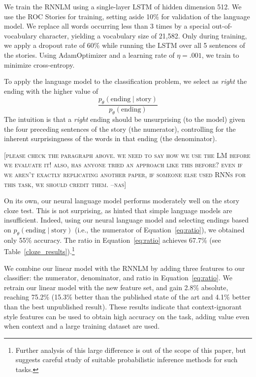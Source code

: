 \documentclass[11pt,a4paper]{article}
\newcommand{\tabref}[1]{Table~\ref{#1}}
\newcommand{\resolved}[1]{}
\newcommand{\nascomment}[1]{{\color{blue}\textsc{[#1 --nas]}}}
\begin{document}
We train the RNNLM using a single-layer LSTM \cite{hochreiter1997long} of hidden dimension 512.
We use the ROC Stories for training, setting aside 10\% for validation of the language model. 
We replace all words occurring less than 3 times by a special
out-of-vocabulary character, yielding a vocabulary size of  21,582.
Only during training, we apply a dropout rate of 60\% while running the LSTM over all 5 sentences of the stories. 
Using AdamOptimizer \cite{kingma2014adam} and a learning rate of
$\eta=.001$, we train to minimize cross-entropy. %

To apply the language model to the classification problem, we select
as \emph{right} the ending with the higher value of
\begin{equation}
\frac{p_\theta(\textrm{ending} \mid
  \textrm{story})}{p_\theta(\textrm{ending})} \label{eq:ratio}
\end{equation}
The intuition is that a \emph{right} ending should be unsurprising (to
the model)
given the four preceding sentences of the story (the numerator), controlling for the
inherent surprisingness of the words in that ending (the denominator).

\nascomment{please check the paragraph above.  we need to say how we
  use the LM before we evaluate it!  also, has anyone tried an approach like this
  before?  even if we aren't exactly replicating another paper, if
  someone else used RNNs for this task, we should credit them.}

On its own, our neural language model performs moderately well on the story cloze test. 
This is not surprising, as \citet{Mostafazadeh:2016} hinted  that
simple language models are insufficient.
Indeed, using our neural language model and selecting endings based on
$p_\theta(\textrm{ending} \mid \textrm{story})$ (i.e., the numerator of
Equation~\ref{eq:ratio}), we obtained only 55\% accuracy.   The ratio
in Equation~\ref{eq:ratio} achieves 67.7\%  (see
\tabref{cloze_results}).\footnote{Further analysis of this large
  difference is out of the scope of this paper, but suggests careful
  study of suitable probabilistic inference methods for such tasks.}

We combine our linear model with the RNNLM by adding three features to
our classifier: the numerator, denominator, and ratio in
Equation~\ref{eq:ratio}. %
We retrain our linear  model with the new feature set, and gain 2.8\%
absolute, reaching 75.2\% (15.3\% better than the published state of
the art and 4.1\% better than the best unpublished result).
These results indicate that context-ignorant style features can be used to obtain high
accuracy on the task, adding value even when context and a large
training dataset are used.  \resolved{\nascomment{check reframing here}}
\end{document}
